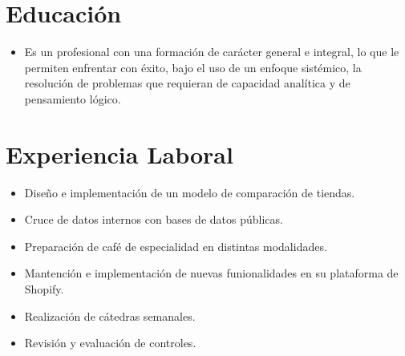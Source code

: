 \documentclass{my_cv}
\begin{document}
\makecvtitle
\vspace*{-1cm}

\section{Educaci\'on \faBook} 
\begin{itemize}
\item Es un profesional con una formación de carácter general e integral, lo que le permiten enfrentar con éxito, bajo el uso de un enfoque sist\'emico, la resolución de problemas que requieran de capacidad analítica y de pensamiento l\'ogico.
\end{itemize}

\section{Experiencia Laboral \faSuitcase}
\begin{itemize}
\item Dise\~no e implementaci\'on de un modelo de comparaci\'on de tiendas.
\item Cruce de datos internos con bases de datos p\'ublicas.
\end{itemize}
\begin{itemize}
\item Preparaci\'on de caf\'e de especialidad en distintas modalidades.
\item Mantenci\'on e implementaci\'on de nuevas funionalidades en su plataforma de Shopify.
\end{itemize}
\begin{itemize}
\item Realizaci\'on de c\'atedras semanales.
\item Revisión y evaluaci\'on de controles.
\end{itemize}
\end{document}
